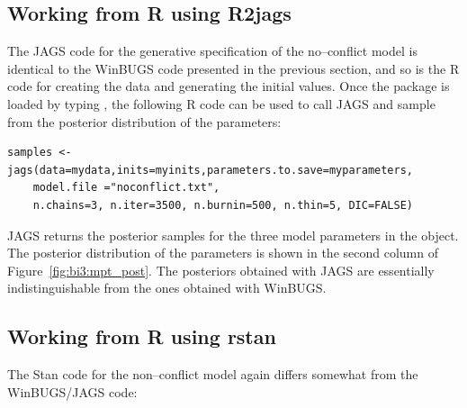 \subsection{Working from R using R2jags}

The JAGS code for the generative specification of the no--conflict model is identical to the WinBUGS code presented in the previous section, and so is the R code for creating the data and generating the initial values. Once the  package is loaded by typing , the following R code can be used to call JAGS and sample from the posterior distribution of the parameters:

\begin{lstlisting}
samples <- jags(data=mydata,inits=myinits,parameters.to.save=myparameters,
    model.file ="noconflict.txt", 
    n.chains=3, n.iter=3500, n.burnin=500, n.thin=5, DIC=FALSE)
\end{lstlisting}

\noindent JAGS returns the posterior samples for the three model parameters in the  object. The posterior distribution of the parameters is shown in the second column of Figure~\ref{fig:bi3:mpt_post}. The posteriors obtained with JAGS are essentially indistinguishable from the ones obtained with WinBUGS.



\subsection{Working from R using rstan}

The Stan code for the non--conflict model again differs somewhat from the {WinBUGS/JAGS} code:

